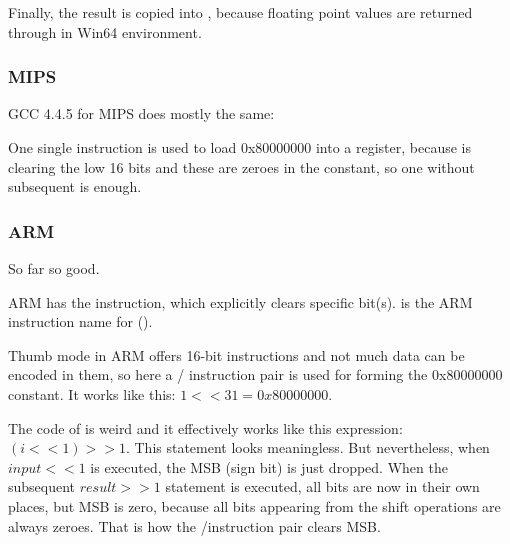Finally, the result is copied into , because floating point values are returned through  in Win64
environment.

\subsubsection{MIPS}

GCC 4.4.5 for MIPS does mostly the same:




One single \LUI instruction is used to load 0x80000000 into a register, because 
\LUI is clearing the low 16 bits and these are zeroes in the constant, so one \LUI without subsequent \ORI is enough.

\subsubsection{ARM}

\myparagraph{\OptimizingKeilVI (\ARMMode)}



So far so good.

ARM has the \BIC instruction, which explicitly clears specific bit(s).
\EOR is the ARM instruction name for \XOR 
().

\myparagraph{\OptimizingKeilVI (\ThumbMode)}



Thumb mode in ARM offers 16-bit instructions and not much data can be encoded in them, so here a 
/ instruction pair is used for forming the 0x80000000 constant.
It works like this: $1<<31 = 0x80000000$.


The code of  is weird and it effectively works like this expression: $(i<<1)>>1$.
This statement looks meaningless.
But nevertheless, when $input<<1$ is executed, the \ac{MSB} (sign bit) is just dropped.
When the subsequent $result>>1$ statement is executed, all bits are now in their own places,
but \ac{MSB} is zero, because all  bits appearing from the shift operations are always zeroes.
That is how the \LSLS/\LSRS instruction pair clears \ac{MSB}.

